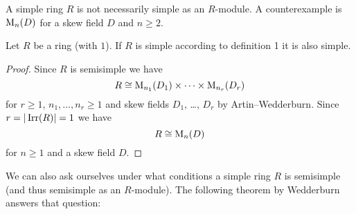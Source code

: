\begin{warn}
  A simple ring $R$ is not necessarily simple as an $R$-module.
  A counterexample is $\operatorname{M}_n(D)$ for a skew field $D$ and $n \geq 2$.
\end{warn}


\begin{lem}
  Let $R$ be a ring (with $1$).
  If $R$ is simple according to definition 1 it is also simple.
\end{lem}
\begin{proof}
  Since $R$ is semisimple we have
  \[
    R \cong \operatorname{M}_{n_1}(D_1) \times \dotsb \times \operatorname{M}_{n_r}(D_r)
  \]
  for $r \geq 1$, $n_1, \dotsc, n_r \geq 1$ and skew fields $D_1$, \dots, $D_r$ by Artin--Wedderburn.
  Since $r = |\operatorname{Irr}(R)| = 1$ we have
  \[
    R \cong \operatorname{M}_n(D)
  \]
  for $n \geq 1$ and a skew field $D$.
\end{proof}


We can also ask ourselves under what conditions a simple ring $R$ is semisimple (and thus semisimple as an $R$-module). The following theorem by Wedderburn answers that question:


